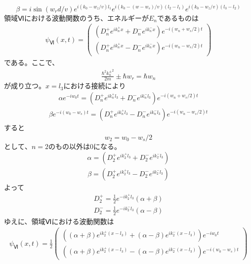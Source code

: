 \begin{align}
{\beta}=i\sin\left(w_{r}d/v\right)e^{i(k_{0}-w_{z}/v)l_{1}}e^{i\left(k_{0}-(w-w_{s})/v\right)(l_{2}-l_{1})}e^{i\left(k_{0}-w_{z}/v\right)(l_{3}-l_{2})}
\end{align}
$領域Ⅵにおける波動関数のうち、エネルギーがE_{n}であるものは$
\begin{align}
{\psi}_{Ⅵ}(x,t)=
\begin{pmatrix}
(D_{n}^{+}e^{ik_{n}^{+}x}+D_{n}^{-}e^{ik_{n}^{-}x} )e^{-i(w_{n}+w_{s}/2)t}\\
(D_{n}^{+}e^{ik_{n}^{+}x}-D_{n}^{-}e^{ik_{n}^{-}x} )e^{-i(w_{n}-w_{s}/2)t}
\end{pmatrix}
\end{align}
である。ここで、
\begin{align}
\frac{{{\hbar}^2}{k_{n}^{\pm}}^2}{2m}{\pm}{\hbar}w_{r}={\hbar}w_{n}
\end{align}
$が成り立つ。x=l_{3}における接続により$
\begin{align}
{\alpha}e^{-iw_{0}t}=\left(D_{n}^{+}e^{ik_{n}^{+}l_{3}}+D_{n}^{-}e^{ik_{n}^{-}l_{3}}\right)e^{-i\left(w_{n}+w_{s}/2\right)t}
\end{align}
\begin{align}
{\beta}e^{-i(w_{0}-w_{s})t}=\left(D_{n}^{+}e^{ik_{n}^{+}l_{3}}-D_{n}^{-}e^{ik_{n}^{-}l_{3}}\right)e^{-i\left(w_{n}-w_{s}/2\right)t}
\end{align}
すると
\begin{align}
w_{2}=w_{0}-w_{s}/2
\end{align}
$として、n=2のもの以外は0になる。$
\begin{align}
{\alpha}=\left(D_{2}^{+}e^{ik_{2}^{+}l_{3}}+D_{2}^{-}e^{ik_{2}^{-}l_{3}}\right)
\end{align}
\begin{align}
{\beta}=\left(D_{2}^{+}e^{ik_{2}^{+}l_{3}}-D_{2}^{-}e^{ik_{2}^{-}l_{3}}\right)
\end{align}
よって
\begin{align}
D_{2}^{+}=\frac{1}{2}e^{-ik_{2}^{+}l_{3}}({\alpha}+{\beta})
\end{align}
\begin{align}
D_{2}^{-}=\frac{1}{2}e^{-ik_{2}^{-}l_{3}}({\alpha}-{\beta})
\end{align}
ゆえに、領域Ⅵにおける波動関数は
\begin{align}
{\psi}_{Ⅵ}(x,t)=\frac{1}{2}
\begin{pmatrix}
\left(({\alpha}+{\beta})e^{ik_{2}^{+}(x-l_{3})}+({\alpha}-{\beta})e^{ik_{2}^{-}(x-l_{3})}\right)e^{-iw_{0}t}\\
\left(({\alpha}+{\beta})e^{ik_{2}^{+}(x-l_{3})}-({\alpha}-{\beta})e^{ik_{2}^{-}(x-l_{3})}\right)e^{-i(w_{0}-w_{s})t}
\end{pmatrix}
\end{align}
